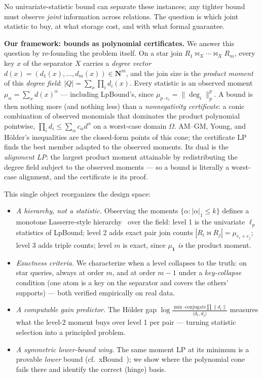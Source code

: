 \noindent No univariate-statistic bound can separate these instances;
any tighter bound must observe \emph{joint} information across
relations.  The question is which joint statistic to buy, at what
storage cost, and with what formal guarantee.

\vspace{1mm}
\noindent\textbf{Our framework: bounds as polynomial certificates.}
We answer this question by re-founding the problem itself.  On a star
join $R_1\Join_X\cdots\Join_X R_m$, every key $x$ of the separator
$X$ carries a \emph{degree vector}
$d(x) = (d_1(x),\dots,d_m(x))\in\mathbf{N}^m$, and the join size is
the \emph{product moment} of this \emph{degree field}:
$|Q| = \sum_x \prod_i d_i(x)$.  Every statistic is an observed moment
$\mu_\alpha = \sum_x d(x)^\alpha$ --- including LpBound's, since
$\mu_{p\cdot e_i} = \|\deg_i\|_p^p$.  A bound is then nothing more
(and nothing less) than a \emph{nonnegativity certificate}: a conic
combination of observed monomials that dominates the product
polynomial pointwise, $\prod_i d_i \le \sum_\alpha c_\alpha d^\alpha$
on a worst-case domain $\Omega$.  AM--GM, Young, and H\"older's
inequalities are the closed-form points of this cone; the certificate
LP finds the best member adapted to the observed moments.  Its dual
is the \emph{alignment LP}: the largest product moment attainable by
redistributing the degree field subject to the observed moments ---
so a bound is literally a worst-case alignment, and the certificate
is its proof.

This single object reorganizes the design space:

\begin{itemize}[leftmargin=10pt,itemsep=1pt]
\item \emph{A hierarchy, not a statistic.}  Observing the moments
  $\{\alpha : |\alpha|_1\le k\}$ defines a monotone Lasserre-style
  hierarchy~\cite{lasserre2001} over the field: level 1 is the
  univariate $\ell_p$ statistics of LpBound; level 2 adds exact pair
  join counts $|R_i\Join R_j| = \mu_{e_i+e_j}$; level 3 adds triple
  counts; level $m$ is exact, since $\mu_{\mathbf{1}}$ \emph{is} the
  product moment.
\item \emph{Exactness criteria.}  We characterize when a level
  collapses to the truth: on star queries, always at order $m$, and
  at order $m{-}1$ under a \emph{key-collapse} condition (one atom is
  a key on the separator and covers the others' supports) --- both
  verified empirically on real data.
\item \emph{A computable gain predictor.}  The H\"older gap
  $\log\frac{\min\text{-conjugate}\prod\|d_i\|}{\langle d_i,d_j\rangle}$
  measures what the level-2 moment buys over level 1 per pair ---
  turning statistic selection into a principled problem.
\item \emph{A symmetric lower-bound wing.}  The same moment LP at its
  minimum is a provable \emph{lower} bound (cf.\
  xBound~\cite{stoian2026xbound}); we show where the polynomial cone
  fails there and identify the correct (hinge) basis.
\end{itemize}

